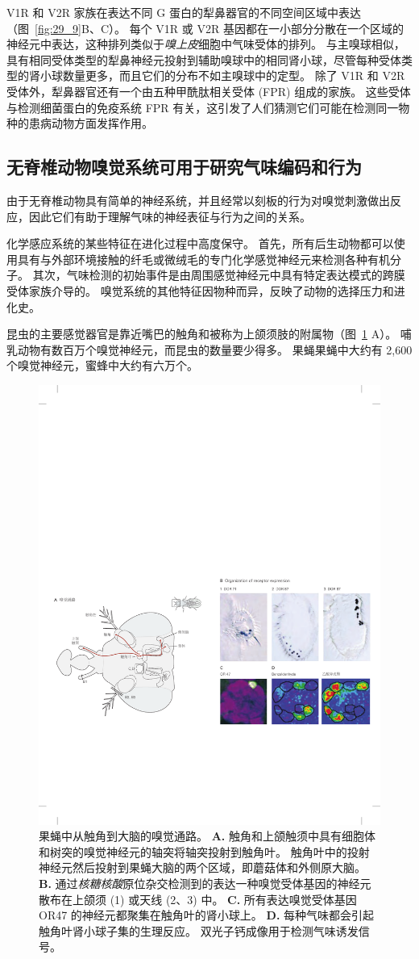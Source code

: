 V1R 和 V2R 家族在表达不同 G 蛋白的犁鼻器官的不同空间区域中表达（图~\ref{fig:29_9}B、C）。
每个 V1R 或 V2R 基因都在一小部分分散在一个区域的神经元中表达，这种排列类似于\textit{嗅上皮}细胞中气味受体的排列。
与主嗅球相似，具有相同受体类型的犁鼻神经元投射到辅助嗅球中的相同肾小球，尽管每种受体类型的肾小球数量更多，而且它们的分布不如主嗅球中的定型。
除了 V1R 和 V2R 受体外，犁鼻器官还有一个由五种甲酰肽相关受体 (FPR) 组成的家族。
这些受体与检测细菌蛋白的免疫系统 FPR 有关，这引发了人们猜测它们可能在检测同一物种的患病动物方面发挥作用。



\subsection{无脊椎动物嗅觉系统可用于研究气味编码和行为}

由于无脊椎动物具有简单的神经系统，并且经常以刻板的行为对嗅觉刺激做出反应，因此它们有助于理解气味的神经表征与行为之间的关系。


化学感应系统的某些特征在进化过程中高度保守。
首先，所有后生动物都可以使用具有与外部环境接触的纤毛或微绒毛的专门化学感觉神经元来检测各种有机分子。 
其次，气味检测的初始事件是由周围感觉神经元中具有特定表达模式的跨膜受体家族介导的。
嗅觉系统的其他特征因物种而异，反映了动物的选择压力和进化史。


昆虫的主要感觉器官是靠近嘴巴的触角和被称为上颌须肢的附属物（图~\ref{fig:29_10} A）。
哺乳动物有数百万个嗅觉神经元，而昆虫的数量要少得多。
果蝇果蝇中大约有 2,600 个嗅觉神经元，蜜蜂中大约有六万个。


\begin{figure}[htbp]
	\centering
	\includegraphics[width=0.6\linewidth]{chap29/fig_29_10}
	\caption{果蝇中从触角到大脑的嗅觉通路。
		\textbf{A.} 触角和上颌触须中具有细胞体和树突的嗅觉神经元的轴突将轴突投射到触角叶。
		触角叶中的投射神经元然后投射到果蝇大脑的两个区域，即蘑菇体和外侧原大脑。
		\textbf{B.} 通过\textit{核糖核酸}原位杂交检测到的表达一种嗅觉受体基因的神经元散布在上颌须 (1) 或天线 (2、3) 中。
		\textbf{C.} 所有表达嗅觉受体基因 OR47 的神经元都聚集在触角叶的肾小球上。
		\textbf{D.} 每种气味都会引起触角叶肾小球子集的生理反应。
		双光子钙成像用于检测气味诱发信号。}
	\label{fig:29_10}
\end{figure}


